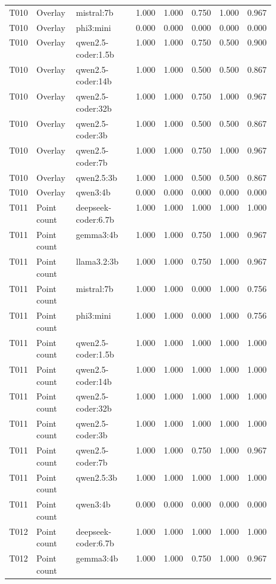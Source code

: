 \begin{longtable}{p{0.08\linewidth}p{0.16\linewidth}p{0.27\linewidth}rrrrr}
T010 & Overlay & mistral:7b & 1.000 & 1.000 & 0.750 & 1.000 & 0.967 \\
T010 & Overlay & phi3:mini & 0.000 & 0.000 & 0.000 & 0.000 & 0.000 \\
T010 & Overlay & qwen2.5-coder:1.5b & 1.000 & 1.000 & 0.750 & 0.500 & 0.900 \\
T010 & Overlay & qwen2.5-coder:14b & 1.000 & 1.000 & 0.500 & 0.500 & 0.867 \\
T010 & Overlay & qwen2.5-coder:32b & 1.000 & 1.000 & 0.750 & 1.000 & 0.967 \\
T010 & Overlay & qwen2.5-coder:3b & 1.000 & 1.000 & 0.500 & 0.500 & 0.867 \\
T010 & Overlay & qwen2.5-coder:7b & 1.000 & 1.000 & 0.750 & 1.000 & 0.967 \\
T010 & Overlay & qwen2.5:3b & 1.000 & 1.000 & 0.500 & 0.500 & 0.867 \\
T010 & Overlay & qwen3:4b & 0.000 & 0.000 & 0.000 & 0.000 & 0.000 \\
T011 & Point count & deepseek-coder:6.7b & 1.000 & 1.000 & 1.000 & 1.000 & 1.000 \\
T011 & Point count & gemma3:4b & 1.000 & 1.000 & 0.750 & 1.000 & 0.967 \\
T011 & Point count & llama3.2:3b & 1.000 & 1.000 & 0.750 & 1.000 & 0.967 \\
T011 & Point count & mistral:7b & 1.000 & 1.000 & 0.000 & 1.000 & 0.756 \\
T011 & Point count & phi3:mini & 1.000 & 1.000 & 0.000 & 1.000 & 0.756 \\
T011 & Point count & qwen2.5-coder:1.5b & 1.000 & 1.000 & 1.000 & 1.000 & 1.000 \\
T011 & Point count & qwen2.5-coder:14b & 1.000 & 1.000 & 1.000 & 1.000 & 1.000 \\
T011 & Point count & qwen2.5-coder:32b & 1.000 & 1.000 & 1.000 & 1.000 & 1.000 \\
T011 & Point count & qwen2.5-coder:3b & 1.000 & 1.000 & 1.000 & 1.000 & 1.000 \\
T011 & Point count & qwen2.5-coder:7b & 1.000 & 1.000 & 0.750 & 1.000 & 0.967 \\
T011 & Point count & qwen2.5:3b & 1.000 & 1.000 & 1.000 & 1.000 & 1.000 \\
T011 & Point count & qwen3:4b & 0.000 & 0.000 & 0.000 & 0.000 & 0.000 \\
T012 & Point count & deepseek-coder:6.7b & 1.000 & 1.000 & 1.000 & 1.000 & 1.000 \\
T012 & Point count & gemma3:4b & 1.000 & 1.000 & 0.750 & 1.000 & 0.967 \\

\end{longtable}
